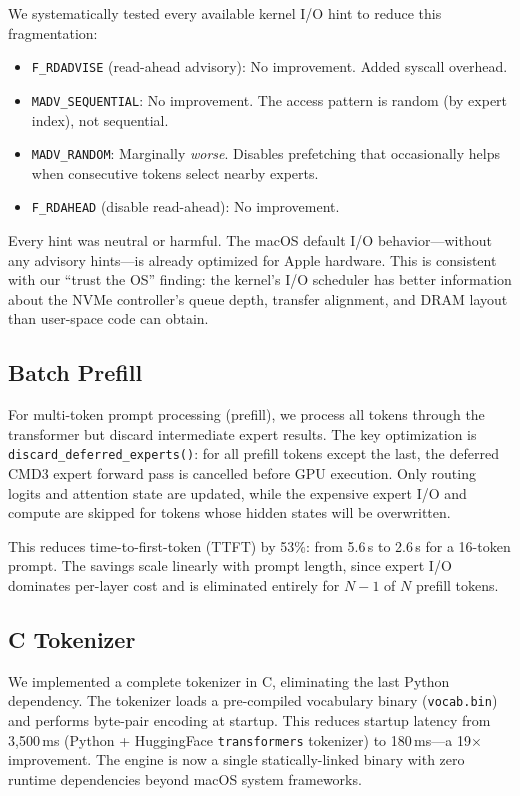 \documentclass[11pt,twocolumn]{article}
\begin{document}
We systematically tested every available kernel I/O hint to reduce this fragmentation:

\begin{itemize}[leftmargin=*,itemsep=2pt]
    \item \texttt{F\_RDADVISE} (read-ahead advisory): No improvement. Added syscall overhead.
    \item \texttt{MADV\_SEQUENTIAL}: No improvement. The access pattern is random (by expert index), not sequential.
    \item \texttt{MADV\_RANDOM}: Marginally \emph{worse}. Disables prefetching that occasionally helps when consecutive tokens select nearby experts.
    \item \texttt{F\_RDAHEAD} (disable read-ahead): No improvement.
\end{itemize}

Every hint was neutral or harmful.
The macOS default I/O behavior---without any advisory hints---is already optimized for Apple hardware.
This is consistent with our ``trust the OS'' finding: the kernel's I/O scheduler has better information about the NVMe controller's queue depth, transfer alignment, and DRAM layout than user-space code can obtain.

\subsection{Batch Prefill}
\label{sec:prefill}

For multi-token prompt processing (prefill), we process all tokens through the transformer but discard intermediate expert results.
The key optimization is \texttt{discard\_deferred\_experts()}: for all prefill tokens except the last, the deferred CMD3 expert forward pass is cancelled before GPU execution.
Only routing logits and attention state are updated, while the expensive expert I/O and compute are skipped for tokens whose hidden states will be overwritten.

This reduces time-to-first-token (TTFT) by 53\%: from 5.6\,s to 2.6\,s for a 16-token prompt.
The savings scale linearly with prompt length, since expert I/O dominates per-layer cost and is eliminated entirely for $N-1$ of $N$ prefill tokens.

\subsection{C Tokenizer}
\label{sec:tokenizer}

We implemented a complete tokenizer in C, eliminating the last Python dependency.
The tokenizer loads a pre-compiled vocabulary binary (\texttt{vocab.bin}) and performs byte-pair encoding at startup.
This reduces startup latency from 3{,}500\,ms (Python + HuggingFace \texttt{transformers} tokenizer) to 180\,ms---a 19$\times$ improvement.
The engine is now a single statically-linked binary with zero runtime dependencies beyond macOS system frameworks.
\end{document}
